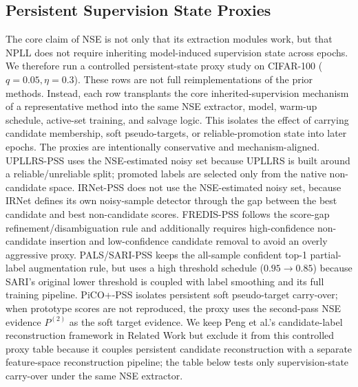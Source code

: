 \subsection{Persistent Supervision State Proxies}
The core claim of NSE is not only that its extraction modules work, but that
NPLL does not require inheriting model-induced supervision state across epochs.
We therefore run a controlled persistent-state proxy study on CIFAR-100
($q=0.05,\eta=0.3$). These rows are not full reimplementations of the prior
methods. Instead, each row transplants the core inherited-supervision mechanism
of a representative method into the same NSE extractor, model, warm-up schedule,
active-set training, and salvage logic. This isolates the effect of carrying
candidate membership, soft pseudo-targets, or reliable-promotion state into
later epochs.
The proxies are intentionally conservative and mechanism-aligned. UPLLRS-PSS
uses the NSE-estimated noisy set because UPLLRS is built around a
reliable/unreliable split; promoted labels are selected only from the native
non-candidate space. IRNet-PSS does not use the NSE-estimated noisy set, because
IRNet defines its own noisy-sample detector through the gap between the best
candidate and best non-candidate scores. FREDIS-PSS follows the score-gap
refinement/disambiguation rule and additionally requires high-confidence
non-candidate insertion and low-confidence candidate removal to avoid an
overly aggressive proxy. PALS/SARI-PSS keeps the all-sample confident top-1
partial-label augmentation rule, but uses a high threshold schedule
($0.95\rightarrow0.85$) because SARI's original lower threshold is coupled with
label smoothing and its full training pipeline. PiCO+-PSS isolates persistent
soft pseudo-target carry-over; when prototype scores are not reproduced, the
proxy uses the second-pass NSE evidence $P^{(2)}$ as the soft target evidence.
We keep Peng et al.'s candidate-label reconstruction framework in Related Work
but exclude it from this controlled proxy table because it couples persistent
candidate reconstruction with a separate feature-space reconstruction pipeline;
the table below tests only supervision-state carry-over under the same NSE
extractor.


